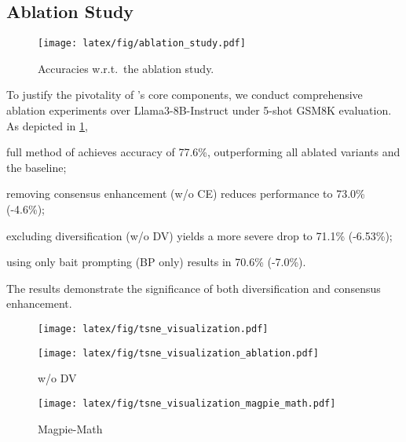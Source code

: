 \subsection{Ablation Study}\label{subsec:ablation}

\begin{figure}[t]
    \centering
  \texttt{[image: latex/fig/ablation\_study.pdf]}
  \caption{Accuracies w.r.t.\ the ablation study.}
  \label{fig:ablation}
\end{figure}

To justify the pivotality of {\langname}'s core components, we conduct comprehensive ablation experiments over Llama3-8B-Instruct under 5-shot GSM8K evaluation. As depicted in \cref{fig:ablation}, 
\begin{enumerate*}[label=(\roman*)]
    \item full method of {\langname} achieves accuracy of 77.6\%, outperforming all ablated variants and the baseline;
    \item removing consensus enhancement (w/o CE) reduces performance to 73.0\% (-4.6\%);
    \item excluding diversification (w/o DV) yields a more severe drop to 71.1\% (-6.53\%);
    \item using only bait prompting (BP only) results in 70.6\% (-7.0\%).
\end{enumerate*}
The results demonstrate the significance of both diversification and consensus enhancement.


\begin{figure*}[t]
\centering
\hspace{0.1cm}
\begin{subfigure}[b]{0.30\linewidth}
    \centering
    \texttt{[image: latex/fig/tsne\_visualization.pdf]}
    \caption{\langname}
    \label{fig:tsne-a}
\end{subfigure}
\hfil
\begin{subfigure}[b]{0.30\linewidth}
    \centering
    \texttt{[image: latex/fig/tsne\_visualization\_ablation.pdf]}
    \caption{\langname w/o DV}
    \label{fig:tsne-b}
\end{subfigure}
\hfil
\begin{subfigure}[b]{0.30\linewidth}
    \centering
    \texttt{[image: latex/fig/tsne\_visualization\_magpie\_math.pdf]}
    \caption{Magpie-Math}
    \label{fig:tsne-c}
\end{subfigure}
\hfil
\hspace{-0.4cm}
\begin{subfigure}[b]{0.06\linewidth}
    \centering
    \label{fig:tsne-c}
\end{subfigure}
\caption{T-SNE visualization of synthetic math questions. Points colored from 1 to 9 represent mathematical questions with increasing difficulty; Gray marks math-related questions (rather than actual mathematical problems).}
\label{fig:ablation tsne}
\end{figure*}

